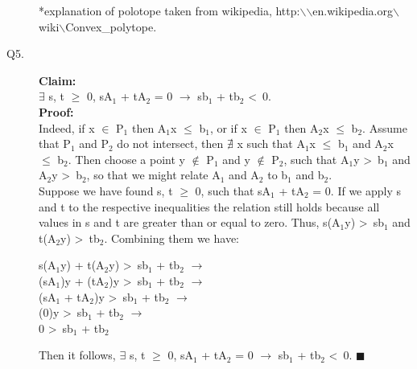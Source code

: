 \documentclass[10pt]{csc_assignment}
\begin{document}
\begin{description}
\tiny{*explanation of polotope taken from wikipedia, http:$\backslash$$\backslash$en.wikipedia.org$\backslash$wiki$\backslash$Convex\_polytope.}\\
\normalsize{}

\newpage
\item[Q5.]
\textbf{Claim:} \\$\exists$ s, t $\geqslant$ 0, sA$_{1}$ + tA$_{2}$ = 0 $\rightarrow$
sb$_{1}$ + tb$_{2}$ \textless ~0.\\
\textbf{Proof:} \\Indeed, if x $\in$ P$_{1}$ then A$_{1}$x $\leqslant$ b$_{1}$, or if x $\in$ P$_{1}$ then A$_{2}$x $\leqslant$ b$_{2}$. Assume that P$_{1}$ and P$_{2}$ do not intersect, then $\nexists$ x such that A$_{1}$x $\leqslant$ b$_{1}$ and A$_{2}$x $\leqslant$ b$_{2}$. Then choose a point y $\notin$ P$_{1}$ and y $\notin$ P$_{2}$, such that A$_{1}$y \textgreater ~b$_{1}$ and A$_{2}$y \textgreater ~b$_{2}$, so that we might relate A$_{1}$ and A$_{2}$ to b$_{1}$ and b$_{2}$.\\

Suppose we have found s, t $\geqslant$ 0, such that sA$_{1}$ + tA$_{2}$ = 0. If we apply
s and t to the respective inequalities the relation still holds because all values in s and t are greater than or equal to zero. Thus, s(A$_{1}$y) \textgreater ~sb$_{1}$ and t(A$_{2}$y) \textgreater ~tb$_{2}$. Combining them we have:\\
\hspace*{1cm}\parbox{16cm}{s(A$_{1}$y) + t(A$_{2}$y) \textgreater ~sb$_{1}$ + tb$_{2}$ $\rightarrow$\\
(sA$_{1}$)y + (tA$_{2}$)y \textgreater ~sb$_{1}$ + tb$_{2}$ $\rightarrow$\\
(sA$_{1}$ + tA$_{2}$)y \textgreater ~sb$_{1}$ + tb$_{2}$ $\rightarrow$\\
(0)y \textgreater ~sb$_{1}$ + tb$_{2}$ $\rightarrow$\\
0 \textgreater ~sb$_{1}$ + tb$_{2}$\\
}
Then it follows, $\exists$ s, t $\geqslant$ 0, sA$_{1}$ + tA$_{2}$ = 0 $\rightarrow$
sb$_{1}$ + tb$_{2}$ \textless ~0. $\blacksquare$\\


\end{description}
\end{document}

